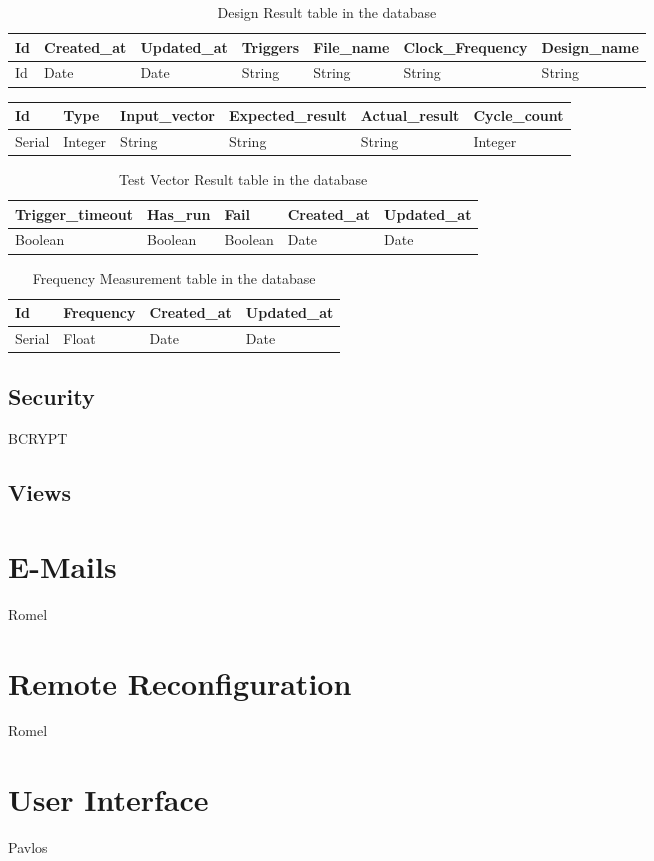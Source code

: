 \begin{table}
\centering
    \begin{tabular}{ | l | l | l | l | l | l | l |}
    \hline
    Id & Created\_at & Updated\_at & Triggers & File\_name & Clock\_Frequency & Design\_name  \\ \hline
    Id & Date & Date & String & String & String & String \\ \hline
    \end{tabular}
    \caption{Design Result table in the database}
    \label{tab:design_result_table}
\end{table}
\begin{center}

    \begin{tabular}{ | l | l | l | l | l | l | }
    \hline
    Id & Type & Input\_vector & Expected\_result & Actual\_result & Cycle\_count\\ \hline
    Serial & Integer & String & String & String & Integer \\ \hline
    \end{tabular}
\end{center}

\begin{table}
\centering
    \begin{tabular}{ | l | l | l | l | l |}
	\hline
       Trigger\_timeout & Has\_run & Fail & Created\_at & Updated\_at\\ \hline
       Boolean & Boolean & Boolean & Date & Date\\ \hline
    \end{tabular}
    \caption{Test Vector Result table in the database}
    \label{tab:Test_vector_result_table}
\end{table}

\begin{table}
\centering
    \begin{tabular}{| l | l | l | l |}
	\hline
       Id & Frequency & Created\_at & Updated\_at\\ \hline
       Serial & Float & Date & Date\\ \hline
    \end{tabular}
    \caption{Frequency Measurement table in the database}
    \label{tab:Frequency_measurement_table}
\end{table}

\subsection{Security}
BCRYPT
\subsection{Views}

\section{E-Mails}
Romel

\section{Remote Reconfiguration}
Romel

\section{User Interface}
Pavlos